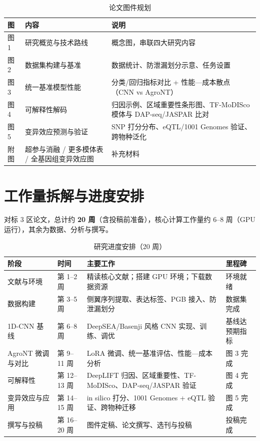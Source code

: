 \documentclass[UTF8,11pt,a4paper]{ctexart}
\begin{document}
\begin{table}[htbp]
\centering
\caption{论文图件规划}
\label{tab:figures}
\small
\begin{tabular}{@{}p{2.0cm}p{4.4cm}p{7.8cm}@{}}
\toprule
\textbf{图} & \textbf{内容} & \textbf{说明} \\
\midrule
图 1 & 研究概览与技术路线 & 概念图，串联四大研究内容 \\
图 2 & 数据集构建与基准 & 数据统计、防泄漏划分示意、任务设置 \\
图 3 & 统一基准模型性能 & 分类/回归指标对比 + 性能—成本散点（CNN vs AgroNT） \\
图 4 & 可解释性解码 & 归因示例、区域重要性条形图、TF-MoDISco 模体与 DAP-seq/JASPAR 比对 \\
图 5 & 变异效应预测与验证 & SNP 打分分布、eQTL/1001 Genomes 验证、跨物种泛化 \\
附图 & 超参与消融 / 更多模体表 / 全基因组变异效应图 & 补充材料 \\
\bottomrule
\end{tabular}
\end{table}

\section{工作量拆解与进度安排}
\label{sec:plan}

对标 3 区论文，总计约 \textbf{20 周}（含投稿前准备），核心计算工作量约 6--8 周（GPU 运行），其余为数据、分析与撰写。

\begin{table}[htbp]
\centering
\caption{研究进度安排（20 周）}
\label{tab:schedule}
\small
\begin{tabular}{@{}p{3.2cm}p{2.0cm}p{7.2cm}p{1.8cm}@{}}
\toprule
\textbf{阶段} & \textbf{时间} & \textbf{主要工作} & \textbf{里程碑} \\
\midrule
文献与环境 & 第 1--2 周 & 精读核心文献；搭建 GPU 环境；下载数据资源 & 环境就绪 \\
数据构建 & 第 3--5 周 & 侧翼序列提取、表达标签、PGB 接入、防泄漏划分 & 数据集完成 \\
1D-CNN 基线 & 第 6--8 周 & DeepSEA/Basenji 风格 CNN 实现、训练、调优 & 基线达预期指标 \\
AgroNT 微调与对比 & 第 9--11 周 & LoRA 微调、统一基准评估、性能—成本分析 & 图 3 完成 \\
可解释性 & 第 12--13 周 & DeepLIFT 归因、区域重要性、TF-MoDISco、DAP-seq/JASPAR 验证 & 图 4 完成 \\
变异效应与应用 & 第 14--15 周 & in silico 打分、1001 Genomes + eQTL 验证、跨物种迁移 & 图 5 完成 \\
撰写与投稿 & 第 16--20 周 & 图件定稿、论文撰写、选刊与投稿 & 投稿完成 \\
\bottomrule
\end{tabular}
\end{table}
\end{document}
